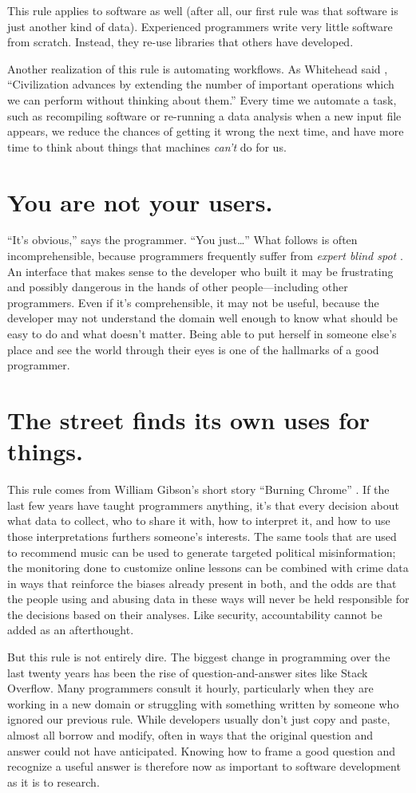 \documentclass[10pt,letterpaper]{article}
\newcommand{\rulemajor}[1]{\section{#1}}
\begin{document}
This rule applies to software as well (after all, our first rule was that
software is just another kind of data).  Experienced programmers write very
little software from scratch.  Instead, they re-use libraries that others have
developed.

Another realization of this rule is automating workflows.  As Whitehead said
\cite{Whit1958}, ``Civilization advances by extending the number of important
operations which we can perform without thinking about them.''  Every time we
automate a task, such as recompiling software or re-running a data analysis when
a new input file appears, we reduce the chances of getting it wrong the next
time, and have more time to think about things that machines \emph{can't} do for
us.

\rulemajor{You are not your users.}

``It's obvious,'' says the programmer. ``You just{\ldots}'' What follows is
often incomprehensible, because programmers frequently suffer from \emph{expert
  blind spot} \cite{Nath2003}.  An interface that makes sense to the developer
who built it may be frustrating and possibly dangerous in the hands of other
people---including other programmers.  Even if it's comprehensible, it may not
be useful, because the developer may not understand the domain well enough to
know what should be easy to do and what doesn't matter.  Being able to put
herself in someone else's place and see the world through their eyes is one of
the hallmarks of a good programmer.

\rulemajor{The street finds its own uses for things.}

This rule comes from William Gibson's short story ``Burning Chrome''
\cite{Gibs1987}.  If the last few years have taught programmers anything, it's
that every decision about what data to collect, who to share it with, how to
interpret it, and how to use those interpretations furthers someone's interests.
The same tools that are used to recommend music can be used to generate targeted
political misinformation; the monitoring done to customize online lessons can be
combined with crime data in ways that reinforce the biases already present in
both, and the odds are that the people using and abusing data in these ways will
never be held responsible for the decisions based on their analyses.  Like
security, accountability cannot be added as an afterthought.

But this rule is not entirely dire.  The biggest change in programming over the
last twenty years has been the rise of question-and-answer sites like Stack
Overflow.  Many programmers consult it hourly, particularly when they are
working in a new domain or struggling with something written by someone who
ignored our previous rule.  While developers usually don't just copy and paste,
almost all borrow and modify, often in ways that the original question and
answer could not have anticipated.  Knowing how to frame a good question and
recognize a useful answer is therefore now as important to software development
as it is to research.
\end{document}
